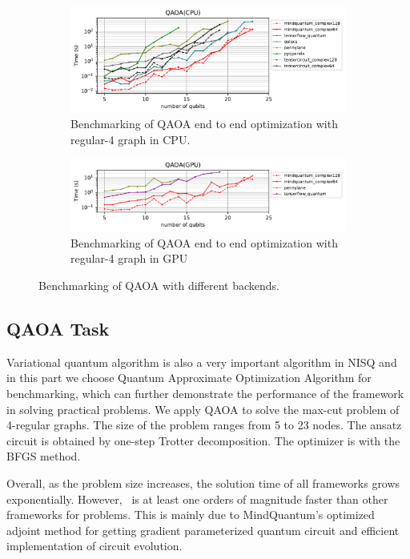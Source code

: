 \begin{figure}
    \centering
    \begin{subfigure}{0.9\textwidth}
        \centering
        \includegraphics[width=\textwidth]{images/7_QAOA_CPU.pdf}
        \caption{Benchmarking of QAOA end to end optimization with regular-4 graph in CPU.}
        \label{7_regular_4_cpu}
    \end{subfigure}
    \begin{subfigure}{0.9\textwidth}
        \centering
        \includegraphics[width=\textwidth]{images/7_QAOA_GPU.pdf}
        \caption{Benchmarking of QAOA end to end optimization with regular-4 graph in GPU}
        \label{7_regular_4_gpu}
    \end{subfigure}
    \caption{Benchmarking of QAOA with different backends.}
\end{figure}

\subsection{QAOA Task}

Variational quantum algorithm is also a very important algorithm in NISQ and in this part we choose Quantum Approximate Optimization Algorithm for benchmarking, which can further demonstrate the performance of the framework in solving practical problems. We apply QAOA to solve the max-cut problem of 4-regular graphs. The size of the problem ranges from 5 to 23 nodes. The ansatz circuit is obtained by one-step Trotter decomposition. The optimizer is  with the BFGS method.

Overall, as the problem size increases, the solution time of all frameworks grows exponentially. However, \MindQuantum\ is at least one orders of magnitude faster than other frameworks for problems. This is mainly due to MindQuantum's optimized adjoint method for getting gradient parameterized quantum circuit and efficient implementation of circuit evolution.

